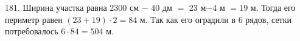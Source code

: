 181. Ширина участка равна 2300 см $-$ 40 дм $=$ 23 м$-$4 м $=19$ м. Тогда его периметр равен $(23+19)\cdot2=84$ м. Так как его оградили в 6 рядов, сетки потребовалось $6\cdot84=504$ м.\\
